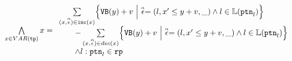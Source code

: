 \begin{enumerate}
\begin{enumerate}
\begin{itemize}
\[\begin{array}{l}
  \bigwedge\limits_{x \in VAR(\tpath)}
    x =   
    \begin{array}{l}
  \sum\limits_{(x, \absevent) \in \inc(x) }\left\{ 
    \varinvar(y) + v ~\middle\vert~ \absevent = (l, x' \leq y + v, \_) \land l \in \lvar(\rpattern_l)\right\}
    \\ \qquad 
    - \sum\limits_{(x, \absevent) \in dec(x) }\left\{ 
      \varinvar(y) + v 
      ~\middle\vert~ \absevent = (l, x' \leq y + v, \_) \land l \in \lvar(\rpattern_l) \right\}
      \\
      \qquad 
      \land l: \rpattern_l \in \rprog
    \end{array}
  \end{array}
\]
%
\end{itemize}
\end{enumerate}
%


\end{enumerate}
